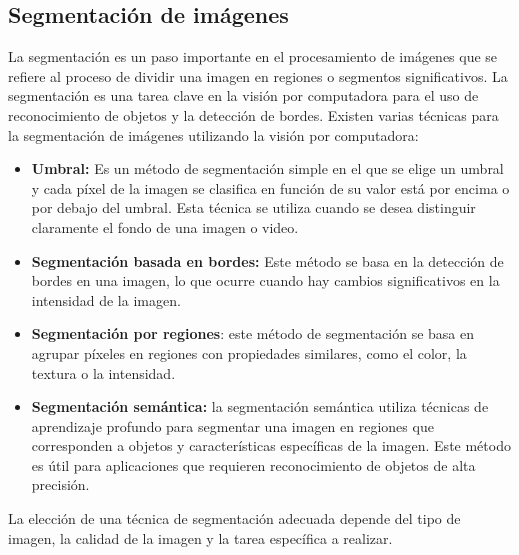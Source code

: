 \subsection{Segmentación de imágenes}
La segmentación es un paso importante en el procesamiento de imágenes que se refiere al proceso de dividir una imagen en regiones o segmentos significativos. La segmentación es una tarea clave en la visión por computadora para el uso de reconocimiento de objetos y la detección de bordes. Existen varias técnicas para la segmentación de imágenes utilizando la visión por computadora:
\begin{itemize}
    \item \textbf{Umbral:} Es un método de segmentación simple en el que se elige un umbral y cada píxel de la imagen se clasifica en función de su valor está por encima o por debajo del umbral. Esta técnica se utiliza cuando se desea distinguir claramente el fondo de una imagen o video. 
    \item \textbf{Segmentación basada en bordes:} Este método se basa en la detección de bordes en una imagen, lo que ocurre cuando hay cambios significativos en la intensidad de la imagen.
    \item \textbf{Segmentación por regiones}: este método de segmentación se basa en agrupar píxeles en regiones con propiedades similares, como el color, la textura o la intensidad. 
    \item \textbf{Segmentación semántica:} la segmentación semántica utiliza técnicas de aprendizaje profundo para segmentar una imagen en regiones que corresponden a objetos y características específicas de la imagen. Este método es útil para aplicaciones que requieren reconocimiento de objetos de alta precisión. 
\end{itemize}
La elección de una técnica de segmentación adecuada depende del tipo de imagen, la calidad de la imagen y la tarea específica a realizar.
    